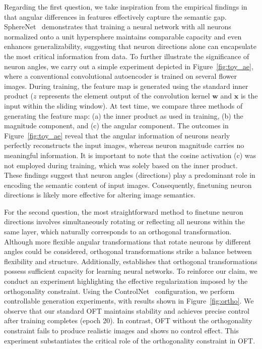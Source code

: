Regarding the first question, we take inspiration from the empirical findings in \cite{liu2018decoupled,chen2020angular} that angular differences in features effectively capture the semantic gap. SphereNet~\cite{liu2017deep} demonstrates that training a neural network with all neurons normalized onto a unit hypersphere maintains comparable capacity and even enhances generalizability, suggesting that neuron directions alone can encapsulate the most critical information from data. To further illustrate the significance of neuron angles, we carry out a simple experiment depicted in Figure~\ref{fig:toy_ae}, where a conventional convolutional autoencoder is trained on several flower images. During training, the feature map is generated using the standard inner product ($z$ represents the element output of the convolution kernel $\bm{w}$ and $\bm{x}$ is the input within the sliding window). At test time, we compare three methods of generating the feature map: (a) the inner product as used in training, (b) the magnitude component, and (c) the angular component. The outcomes in Figure~\ref{fig:toy_ae} reveal that the angular information of neurons nearly perfectly reconstructs the input images, whereas neuron magnitude carries no meaningful information. It is important to note that the cosine activation (c) was not employed during training, which was solely based on the inner product. These findings suggest that neuron angles (directions) play a predominant role in encoding the semantic content of input images. Consequently, finetuning neuron directions is likely more effective for altering image semantics.

For the second question, the most straightforward method to finetune neuron directions involves simultaneously rotating or reflecting all neurons within the same layer, which naturally corresponds to an orthogonal transformation. Although more flexible angular transformations that rotate neurons by different angles could be considered, orthogonal transformations strike a balance between flexibility and structure. Additionally, \cite{liu2021orthogonal} establishes that orthogonal transformations possess sufficient capacity for learning neural networks. To reinforce our claim, we conduct an experiment highlighting the effective regularization imposed by the orthogonality constraint. Using the ControlNet~\cite{zhang2023adding} configuration, we perform controllable generation experiments, with results shown in Figure~\ref{fig:ortho}. We observe that our standard OFT maintains stability and achieves precise control after training completes (epoch 20). In contrast, OFT without the orthogonality constraint fails to produce realistic images and shows no control effect. This experiment substantiates the critical role of the orthogonality constraint in OFT.

